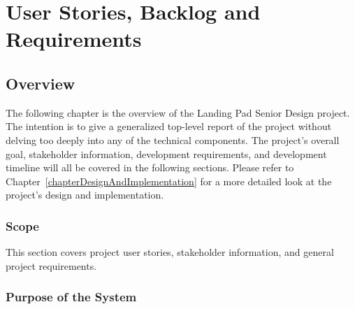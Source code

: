 \chapter{User Stories, Backlog and Requirements}
\section{Overview}


%
%



The following chapter is the overview of the Landing Pad Senior Design project. The intention is to give a generalized top-level report of the project without delving too deeply into any of the technical components. The project's overall goal, stakeholder information, development requirements, and development timeline will all be covered in the following sections. Please refer to Chapter~\ref{chapterDesignAndImplementation} for a more detailed look at the project's design and implementation.





\subsection{Scope}



This section covers project user stories, stakeholder information, and general project requirements.


\subsection{Purpose of the System}


